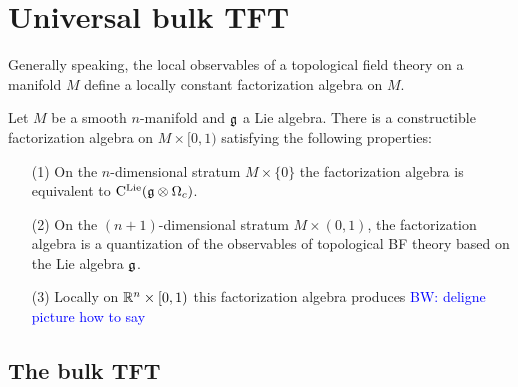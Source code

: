 \documentclass[11pt]{amsart}
\numberwithin{equation}{section}
\def\brian{\textcolor{blue}{BW: }\textcolor{blue}}
\def\greg{\textcolor{red}{GG: }\textcolor{red}}
\begin{document}
%

\section{Universal bulk TFT}
\label{sec: TFT}

Generally speaking, the local observables of a topological field theory on a manifold $M$ define a locally constant factorization algebra on $M$. 

\begin{thm}
Let $M$ be a smooth $n$-manifold and $\mathfrak g$ a Lie algebra. 
There is a constructible factorization algebra on $M \times [0,1)$ satisfying the following properties:
\begin{itemize}
\item[(1)] On the $n$-dimensional stratum $M \times \{0\}$ the factorization algebra is equivalent to ${\rm C}^{\rm Lie} (\mathfrak g \otimes \Omega_c)$.
\item[(2)] On the $(n+1)$-dimensional stratum $M \times (0,1)$, the factorization algebra is a quantization of the observables of topological BF theory based on the Lie algebra $\mathfrak g$.
\item[(3)] Locally on $\mathbb R^n \times [0,1)$ this factorization algebra produces \brian{deligne picture how to say}
\end{itemize}
\end{thm}


\subsection{The bulk TFT}
\end{document}
